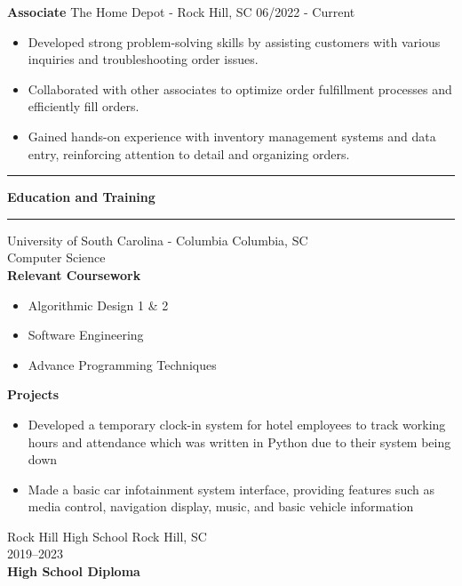 \documentclass[10pt, letterpaper]{article}
\newcommand{\ressection}[1]{%
  \vspace{6pt}
  \begin{center}
    \rule{0.3\textwidth}{0.4pt}\quad\textbf{#1}\quad\rule{0.3\textwidth}{0.4pt}
  \end{center}
  \vspace{2pt}
}
\newcommand{\expentry}[3]{%
  \begin{center}
    \textbf{#1} \textbar{} #2 \textbar{} #3
  \end{center}
}
\begin{document}
\vspace{4pt}

\expentry{Associate}{The Home Depot - Rock Hill, SC}{06/2022 - Current}

\begin{itemize}[leftmargin=1.5em, itemsep=1pt, topsep=1pt]
  \item Developed strong problem-solving skills by assisting customers with various inquiries and troubleshooting order issues.
  \item Collaborated with other associates to optimize order fulfillment processes and efficiently fill orders.
  \item Gained hands-on experience with inventory management systems and data entry, reinforcing attention to detail and organizing orders.
\end{itemize}

\ressection{Education and Training}

\begin{center}
  University of South Carolina - Columbia \quad\textbar\quad Columbia, SC\\[3pt]
  Computer Science\\[5pt]
  \textbf{Relevant Coursework}
\end{center}

\begin{itemize}[leftmargin=1.5em, itemsep=1pt, topsep=1pt]
  \item Algorithmic Design 1 \& 2
  \item Software Engineering
  \item Advance Programming Techniques
\end{itemize}

\begin{center}
  \textbf{Projects}
\end{center}

\begin{itemize}[leftmargin=1.5em, itemsep=1pt, topsep=1pt]
  \item Developed a temporary clock-in system for hotel employees to track working hours and attendance which was written in Python due to their system being down
  \item Made a basic car infotainment system interface, providing features such as media control, navigation display, music, and basic vehicle information
\end{itemize}

\vspace{4pt}

\begin{center}
  Rock Hill High School \quad\textbar\quad Rock Hill, SC\\[3pt]
  2019--2023\\
  \textbf{High School Diploma}
\end{center}
\end{document}
